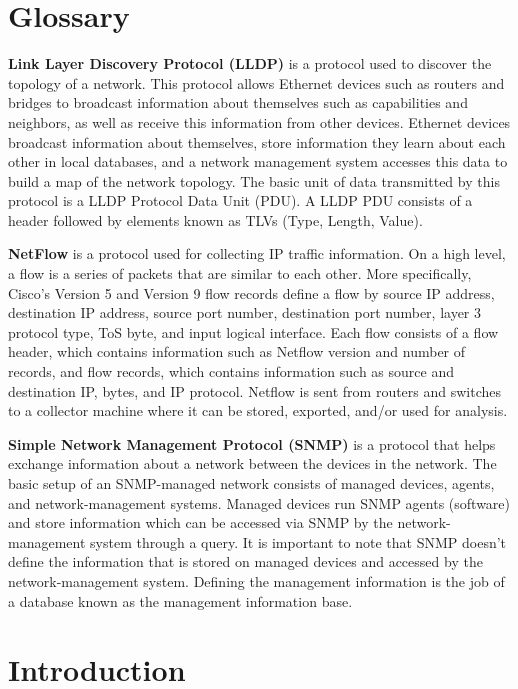 \documentclass{sig-alternate}
\begin{document}
\section*{Glossary}

\textbf{Link Layer Discovery Protocol (LLDP)} is a protocol used to discover the
topology of a network. This protocol allows Ethernet devices such as routers and
bridges to broadcast information about themselves such as capabilities and
neighbors, as well as receive this information from other devices.  Ethernet
devices broadcast information about themselves, store information they learn
about each other in local databases, and a network management system accesses
this data to build a map of the network topology. The basic unit of data
transmitted by this protocol is a LLDP Protocol Data Unit (PDU). A LLDP PDU
consists of a header followed by elements known as TLVs (Type, Length, Value).

\textbf{NetFlow} is a protocol used for collecting IP traffic information. On a
high level, a flow is a series of packets that are similar to each other. More
specifically, Cisco's Version 5 and Version 9 flow records define a flow by
source IP address, destination IP address, source port number, destination port
number, layer 3 protocol type, ToS byte, and input logical interface. Each flow
consists of a flow header, which contains information such as Netflow version
and number of records, and flow records, which contains information such as
source and destination IP, bytes, and IP protocol. Netflow is sent from routers
and switches to a collector machine where it can be stored, exported, and/or
used for analysis.

\textbf{Simple Network Management Protocol (SNMP)} is a protocol that helps
exchange information about a network between the devices in the network. The
basic setup of an SNMP-managed network consists of managed devices, agents, and
network-management systems. Managed devices run SNMP agents (software) and store
information which can be accessed via SNMP by the network-management system
through a query. It is important to note that SNMP doesn’t define the
information that is stored on managed devices and accessed by the
network-management system. Defining the management information is the job of a
database known as the management information base.

\section{Introduction}
\end{document}
